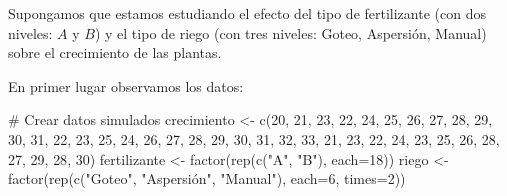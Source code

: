 \documentclass[
  letterpaper,
  DIV=11,
  numbers=noendperiod]{scrreprt}
\newenvironment{Shaded}{\begin{snugshade}}{\end{snugshade}}
\newcommand{\AttributeTok}[1]{\textcolor[rgb]{0.40,0.45,0.13}{#1}}
\newcommand{\CommentTok}[1]{\textcolor[rgb]{0.37,0.37,0.37}{#1}}
\newcommand{\DecValTok}[1]{\textcolor[rgb]{0.68,0.00,0.00}{#1}}
\newcommand{\FunctionTok}[1]{\textcolor[rgb]{0.28,0.35,0.67}{#1}}
\newcommand{\NormalTok}[1]{\textcolor[rgb]{0.00,0.23,0.31}{#1}}
\newcommand{\OtherTok}[1]{\textcolor[rgb]{0.00,0.23,0.31}{#1}}
\newcommand{\StringTok}[1]{\textcolor[rgb]{0.13,0.47,0.30}{#1}}
\begin{document}
\begin{tcolorbox}[enhanced jigsaw, arc=.35mm, breakable, coltitle=black, left=2mm, opacityback=0, bottomtitle=1mm, colbacktitle=quarto-callout-tip-color!10!white, title=\textcolor{quarto-callout-tip-color}{\faLightbulb}\hspace{0.5em}{Ejemplo. ANOVA de dos factores no significativos}, titlerule=0mm, colback=white, colframe=quarto-callout-tip-color-frame, bottomrule=.15mm, rightrule=.15mm, opacitybacktitle=0.6, toptitle=1mm, toprule=.15mm, leftrule=.75mm]

Supongamos que estamos estudiando el efecto del tipo de fertilizante
(con dos niveles: \(A\) y \(B\)) y el tipo de riego (con tres niveles:
Goteo, Aspersión, Manual) sobre el crecimiento de las plantas.

En primer lugar observamos los datos:

\begin{Shaded}
\begin{Highlighting}[]
\CommentTok{\# Crear datos simulados}
\NormalTok{crecimiento }\OtherTok{\textless{}{-}} \FunctionTok{c}\NormalTok{(}\DecValTok{20}\NormalTok{, }\DecValTok{21}\NormalTok{, }\DecValTok{23}\NormalTok{, }\DecValTok{22}\NormalTok{, }\DecValTok{24}\NormalTok{, }\DecValTok{25}\NormalTok{, }\DecValTok{26}\NormalTok{, }\DecValTok{27}\NormalTok{, }\DecValTok{28}\NormalTok{, }\DecValTok{29}\NormalTok{, }\DecValTok{30}\NormalTok{, }\DecValTok{31}\NormalTok{,}
                 \DecValTok{22}\NormalTok{, }\DecValTok{23}\NormalTok{, }\DecValTok{25}\NormalTok{, }\DecValTok{24}\NormalTok{, }\DecValTok{26}\NormalTok{, }\DecValTok{27}\NormalTok{, }\DecValTok{28}\NormalTok{, }\DecValTok{29}\NormalTok{, }\DecValTok{30}\NormalTok{, }\DecValTok{31}\NormalTok{, }\DecValTok{32}\NormalTok{, }\DecValTok{33}\NormalTok{,}
                 \DecValTok{21}\NormalTok{, }\DecValTok{23}\NormalTok{, }\DecValTok{22}\NormalTok{, }\DecValTok{24}\NormalTok{, }\DecValTok{23}\NormalTok{, }\DecValTok{25}\NormalTok{, }\DecValTok{26}\NormalTok{, }\DecValTok{28}\NormalTok{, }\DecValTok{27}\NormalTok{, }\DecValTok{29}\NormalTok{, }\DecValTok{28}\NormalTok{, }\DecValTok{30}\NormalTok{)}
\NormalTok{fertilizante }\OtherTok{\textless{}{-}} \FunctionTok{factor}\NormalTok{(}\FunctionTok{rep}\NormalTok{(}\FunctionTok{c}\NormalTok{(}\StringTok{"A"}\NormalTok{, }\StringTok{"B"}\NormalTok{), }\AttributeTok{each=}\DecValTok{18}\NormalTok{))}
\NormalTok{riego }\OtherTok{\textless{}{-}} \FunctionTok{factor}\NormalTok{(}\FunctionTok{rep}\NormalTok{(}\FunctionTok{c}\NormalTok{(}\StringTok{"Goteo"}\NormalTok{, }\StringTok{"Aspersión"}\NormalTok{, }\StringTok{"Manual"}\NormalTok{), }\AttributeTok{each=}\DecValTok{6}\NormalTok{, }\AttributeTok{times=}\DecValTok{2}\NormalTok{))}


\end{Highlighting}
\end{Shaded}
\end{tcolorbox}
\end{document}
